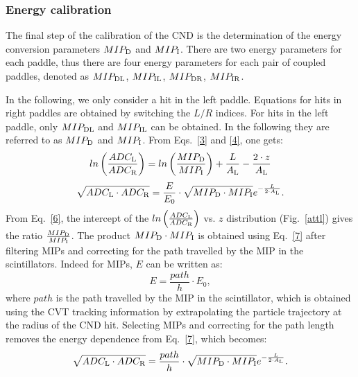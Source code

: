 \subsubsection{Energy calibration }\label{sec_energy_cal}

The final step of the calibration of the CND is the determination of the energy conversion parameters $MIP_{\rm{D}}$ and $MIP_{\rm{I}}$. There are two energy parameters for each paddle, thus there are four energy parameters for each pair of coupled paddles, denoted as $MIP_{\rm{DL}}$, $MIP_{\rm{IL}}$, $MIP_{\rm{DR}}$, $MIP_{\rm{IR}}$.

In the following, we only consider a hit in the left paddle. Equations for hits in right paddles are obtained by switching the $L/R$ indices. For hits in the left paddle, only $MIP_{\rm{DL}}$ and $MIP_{\rm{IL}}$ can be obtained. In the following they are referred to as $MIP_{\rm{D}}$ and $MIP_{\rm{I}}$. From Eqs.~\ref{3} and \ref{4}, one gets:
\begin{equation}
\label{6}
ln\left(\frac{ADC_{\rm{L}}}{ADC_{\rm{R}}}\right)=ln\left(\frac{MIP_{\rm{D}}}{MIP_{\rm{I}}}\right)+{\frac{L}{A_{\rm{L}}}}-\frac{2\cdot z}{A_{\rm{L}}}
\end{equation}
\begin{equation}
\label{7}
\sqrt{ADC_{\rm{L}}\cdot ADC_{\rm{R}}}=\frac{E}{E_0}\cdot \sqrt{MIP_{\rm{D}}\cdot MIP_{\rm{I}}} e^{-\frac{L}{2\cdot A_{\rm{L}}}}.
\end{equation}
From Eq.~\ref{6}, the intercept of the $ln\left(\frac{ADC_{\rm{L}}}{ADC_{\rm{R}}}\right)$ vs. $z$ distribution (Fig.~\ref{attl}) gives the ratio $\frac{MIP_{\rm{D}}}{MIP_{\rm{I}}}$. %
The product $MIP_{\rm{D}}\cdot MIP_{\rm{I}}$ is obtained using Eq.~\ref{7} after filtering MIPs and correcting for the path travelled by the MIP in the scintillators. Indeed for MIPs, $E$ can be written as:
\begin{equation}
E=\frac{path}{h}\cdot E_0,
\end{equation}
where $path$ is the path travelled by the MIP in the scintillator, which is obtained using the CVT tracking information by extrapolating the particle trajectory at the radius of the CND hit.
Selecting MIPs and correcting for the path length removes the energy dependence from Eq.~\ref{7}, which becomes:
\begin{equation}
\sqrt{ADC_{\rm{L}}\cdot ADC_{\rm{R}}}=\frac{path}{h}\cdot \sqrt{MIP_{\rm{D}}\cdot MIP_{\rm{I}}} e^{-\frac{L}{2\cdot A_{\rm{L}}}} .
\end{equation}

